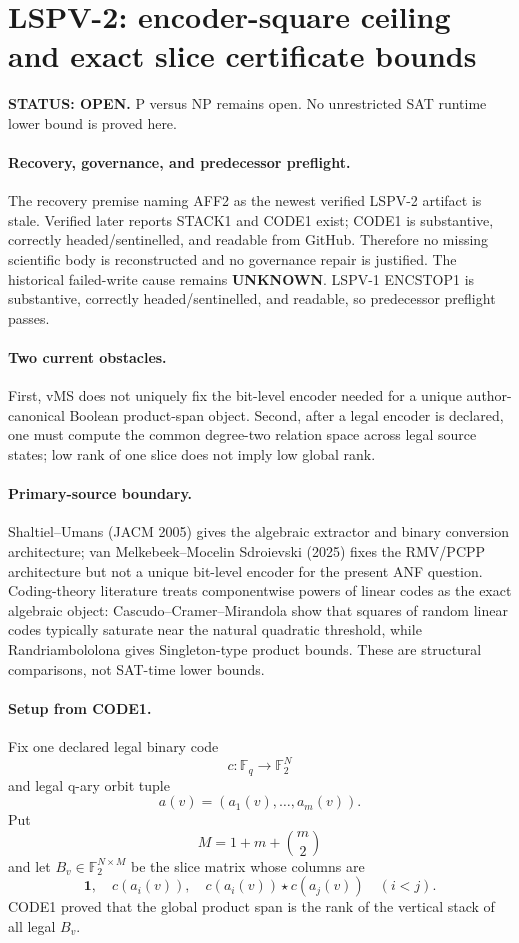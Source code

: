 \documentclass[11pt]{article}
\begin{document}
\section*{LSPV-2: encoder-square ceiling and exact slice certificate bounds}
\textbf{STATUS: OPEN.} P versus NP remains open. No unrestricted SAT runtime lower bound is proved here.

\paragraph{Recovery, governance, and predecessor preflight.}
The recovery premise naming AFF2 as the newest verified LSPV-2 artifact is stale. Verified later reports STACK1 and CODE1 exist; CODE1 is substantive, correctly headed/sentinelled, and readable from GitHub. Therefore no missing scientific body is reconstructed and no governance repair is justified. The historical failed-write cause remains \textbf{UNKNOWN}. LSPV-1 ENCSTOP1 is substantive, correctly headed/sentinelled, and readable, so predecessor preflight passes.

\paragraph{Two current obstacles.}
First, vMS does not uniquely fix the bit-level encoder needed for a unique author-canonical Boolean product-span object. Second, after a legal encoder is declared, one must compute the common degree-two relation space across legal source states; low rank of one slice does not imply low global rank.

\paragraph{Primary-source boundary.}
Shaltiel--Umans (JACM 2005) gives the algebraic extractor and binary conversion architecture; van Melkebeek--Mocelin Sdroievski (2025) fixes the RMV/PCPP architecture but not a unique bit-level encoder for the present ANF question. Coding-theory literature treats componentwise powers of linear codes as the exact algebraic object: Cascudo--Cramer--Mirandola show that squares of random linear codes typically saturate near the natural quadratic threshold, while Randriambololona gives Singleton-type product bounds. These are structural comparisons, not SAT-time lower bounds.

\paragraph{Setup from CODE1.}
Fix one declared legal binary code
\[
c:\mathbb F_q\to\mathbb F_2^N
\]
and legal q-ary orbit tuple
\[
a(v)=(a_1(v),\ldots,a_m(v)).
\]
Put
\[
M=1+m+\binom m2
\]
and let \(B_v\in\mathbb F_2^{N\times M}\) be the slice matrix whose columns are
\[
\mathbf 1,\quad c(a_i(v)),\quad c(a_i(v))\star c(a_j(v))\quad(i<j).
\]
CODE1 proved that the global product span is the rank of the vertical stack of all legal \(B_v\).
\end{document}
